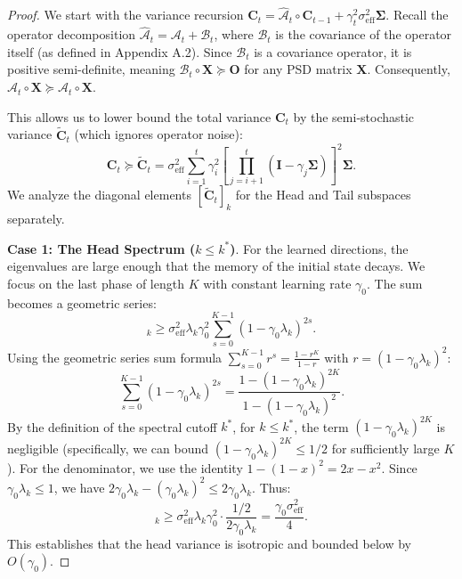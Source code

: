 \documentclass{article}
\theoremstyle{definition}
\theoremstyle{definition}
\theoremstyle{plain}
\theoremstyle{plain}
\theoremstyle{plain}
\theoremstyle{plain}
\theoremstyle{plain}
\newcommand{\bs}[1]{\boldsymbol{\mathbf{#1}}}
\newcommand{\mc}[1]{{\mathcal{#1}}}
\newcommand{\eff}{\mathrm{eff}}
\newcommand{\id}{\mathbf{I}}
\begin{document}
\begin{proof}
    We start with the variance recursion $\bs C_t = \mc{\widehat A}_t \circ \bs C_{t-1} + \gamma_t^2 \sigma_\eff^2 \bs \Sigma$.
    Recall the operator decomposition $\widehat{\mc A}_t = \mc A_t + \mc B_t$, where $\mc B_t$ is the covariance of the operator itself (as defined in Appendix A.2). Since $\mc B_t$ is a covariance operator, it is positive semi-definite, meaning $\mc B_t \circ \bs X \succeq \bs O$ for any PSD matrix $\bs X$. Consequently, $\mc{\widehat A}_t \circ \bs X \succeq \mc A_t \circ \bs X$.
    
    This allows us to lower bound the total variance $\bs C_t$ by the semi-stochastic variance $\tilde{\bs C}_t$ (which ignores operator noise):
    \begin{equation}
        \bs C_t \succeq \tilde{\bs C}_t = \sigma_\eff^2 \sum_{i = 1}^t \gamma_i^2 \left[ \prod_{j=i+1}^t(\id-\gamma_j\bs\Sigma) \right]^2 \bs \Sigma.
    \end{equation}
    We analyze the diagonal elements $[\tilde{\bs C}_t]_k$ for the Head and Tail subspaces separately.
    
    \textbf{Case 1: The Head Spectrum ($k \leq k^*$)}.
    For the learned directions, the eigenvalues are large enough that the memory of the initial state decays. We focus on the last phase of length $K$ with constant learning rate $\gamma_0$. The sum becomes a geometric series:
    \begin{equation}
        [\tilde{\bs C}_t]_k \ge \sigma_\eff^2 \lambda_k \gamma_0^2 \sum_{s=0}^{K-1} (1-\gamma_0 \lambda_k)^{2s}.
    \end{equation}
    Using the geometric series sum formula $\sum_{s=0}^{K-1} r^s = \frac{1-r^K}{1-r}$ with $r = (1-\gamma_0 \lambda_k)^2$:
    \begin{equation}
        \sum_{s=0}^{K-1} (1-\gamma_0 \lambda_k)^{2s} = \frac{1 - (1-\gamma_0 \lambda_k)^{2K}}{1 - (1-\gamma_0 \lambda_k)^2}.
    \end{equation}
    By the definition of the spectral cutoff $k^*$, for $k \le k^*$, the term $(1-\gamma_0 \lambda_k)^{2K}$ is negligible (specifically, we can bound $(1-\gamma_0 \lambda_k)^{2K} \le 1/2$ for sufficiently large $K$). For the denominator, we use the identity $1-(1-x)^2 = 2x - x^2$. Since $\gamma_0 \lambda_k \le 1$, we have $2\gamma_0 \lambda_k - (\gamma_0 \lambda_k)^2 \le 2\gamma_0 \lambda_k$. Thus:
    \begin{equation}
        [\tilde{\bs C}_t]_k \ge \sigma_\eff^2 \lambda_k \gamma_0^2 \cdot \frac{1/2}{2\gamma_0 \lambda_k} = \frac{\gamma_0 \sigma_\eff^2}{4}.
    \end{equation}
    This establishes that the head variance is isotropic and bounded below by $O(\gamma_0)$.


\end{proof}
\end{document}
